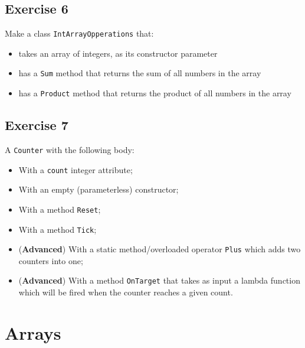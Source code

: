 \subsection{Exercise 6} 
Make a class \texttt{IntArrayOpperations} that:
            \begin{itemize}
                \item takes an array of integers, as its constructor parameter
                \item has a \texttt{Sum} method that returns the sum of all numbers in the array
                \item has a \texttt{Product} method that returns the product of all numbers in the array
            \end{itemize}

\subsection{Exercise 7} 
A \texttt{Counter} with the following body:
            \begin{itemize}
                \item With a \texttt{count} integer attribute;
                \item With an empty (parameterless) constructor;
                \item With a method \texttt{Reset};
                \item With a method \texttt{Tick};
                \item (\textbf{Advanced}) With a static method/overloaded operator \texttt{Plus} which adds two counters into one;
                \item (\textbf{Advanced}) With a method \texttt{OnTarget} that takes as input a lambda function which will be fired when the counter reaches a given count.
            \end{itemize}
            
    \section{Arrays}
